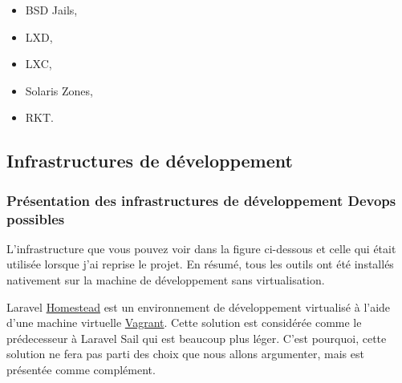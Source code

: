 \documentclass[
    iai, %
    il, %
]{heig-tb}
\begin{document}
\begin{itemize}
    \item BSD Jails, %
    \item LXD, %
    \item LXC, %
    \item Solaris Zones, %
    \item RKT. %
\end{itemize}

\subsection{Infrastructures de développement}

\subsubsection{Présentation des infrastructures de développement Devops possibles}
L'infrastructure que vous pouvez voir dans la figure ci-dessous et celle qui était utilisée lorsque j'ai reprise le projet.
En résumé, tous les outils ont été installés nativement sur la machine de développement sans virtualisation.



Laravel \href{https://laravel.com/docs/9.x/homestead}{Homestead} est un environnement de développement virtualisé à l'aide d'une machine virtuelle \href{https://www.vagrantup.com/}{Vagrant}.
Cette solution est considérée comme le prédecesseur à Laravel Sail qui est beaucoup plus léger.
C'est pourquoi, cette solution ne fera pas parti des choix que nous allons argumenter, mais est présentée comme complément.

\end{document}
